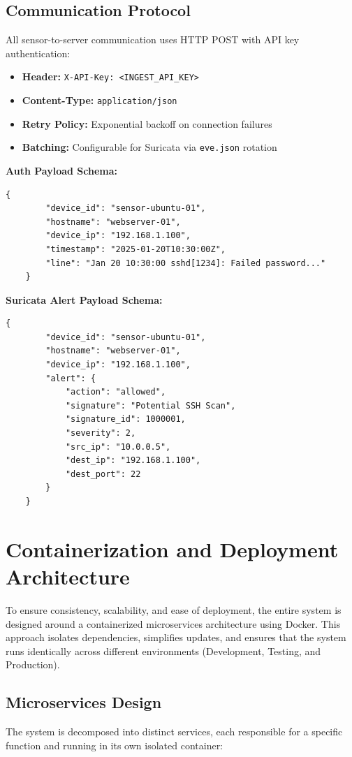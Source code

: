 \documentclass[12pt,a4paper]{report} %
\begin{document}
\subsection{Communication Protocol}
All sensor-to-server communication uses HTTP POST with API key authentication:

\begin{itemize}
	\item \textbf{Header:} \texttt{X-API-Key: <INGEST\_API\_KEY>}
	\item \textbf{Content-Type:} \texttt{application/json}
	\item \textbf{Retry Policy:} Exponential backoff on connection failures
	\item \textbf{Batching:} Configurable for Suricata via \texttt{eve.json} rotation
\end{itemize}

\textbf{Auth Payload Schema:}
\begin{lstlisting}[style=python,caption=Auth Event Payload]
	{
		"device_id": "sensor-ubuntu-01",
		"hostname": "webserver-01",
		"device_ip": "192.168.1.100",
		"timestamp": "2025-01-20T10:30:00Z",
		"line": "Jan 20 10:30:00 sshd[1234]: Failed password..."
	}
\end{lstlisting}

\textbf{Suricata Alert Payload Schema:}
\begin{lstlisting}[style=python,caption=Suricata Alert Payload]
	{
		"device_id": "sensor-ubuntu-01",
		"hostname": "webserver-01",
		"device_ip": "192.168.1.100",
		"alert": {
			"action": "allowed",
			"signature": "Potential SSH Scan",
			"signature_id": 1000001,
			"severity": 2,
			"src_ip": "10.0.0.5",
			"dest_ip": "192.168.1.100",
			"dest_port": 22
		}
	}
\end{lstlisting}


\section{Containerization and Deployment Architecture}
To ensure consistency, scalability, and ease of deployment, the entire system is designed around a containerized microservices architecture using Docker. This approach isolates dependencies, simplifies updates, and ensures that the system runs identically across different environments (Development, Testing, and Production).

\subsection{Microservices Design}
The system is decomposed into distinct services, each responsible for a specific function and running in its own isolated container:
\end{document}
